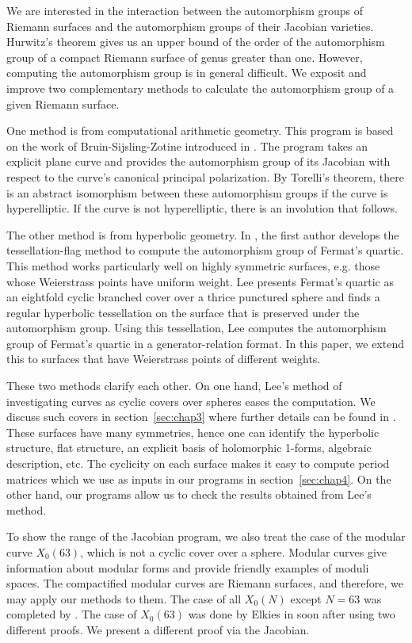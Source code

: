 \documentclass[12pt,reqno]{amsart}
\theoremstyle{definition}
\theoremstyle{remark}
\begin{document}
We are interested in the interaction between the automorphism groups of Riemann surfaces and the automorphism groups of their Jacobian varieties. Hurwitz's theorem gives us an upper bound of the order of the automorphism group of a compact Riemann surface of genus greater than one. However, computing the automorphism group is in general difficult. We exposit and improve two complementary methods to calculate the automorphism group of a given Riemann surface.

One method is from computational arithmetic geometry. This program is based on the work of Bruin-Sijsling-Zotine introduced in \cite{jeroen}. The program takes an explicit plane curve and provides the automorphism group of its Jacobian with respect to the curve's canonical principal polarization. By Torelli's theorem, there is an abstract isomorphism between these automorphism groups if the curve is hyperelliptic. If the curve is not hyperelliptic, there is an involution that follows.

The other method is from hyperbolic geometry. In \cite{dami}, the first author develops the tessellation-flag method to compute the automorphism group of Fermat's quartic. This method works particularly well on highly symmetric surfaces, e.g. those whose Weierstrass points have uniform weight. Lee presents Fermat's quartic as an eightfold cyclic branched cover over a thrice punctured sphere and finds a regular hyperbolic tessellation on the surface that is preserved under the automorphism group. Using this tessellation, Lee computes the automorphism group of Fermat's quartic in a generator-relation format. In this paper, we extend this to surfaces that have Weierstrass points of different weights.

These two methods clarify each other. On one hand, Lee's method of investigating curves as cyclic covers over spheres eases the computation. We discuss such covers in section~\ref{sec:chap3} where further details can be found in \cite{dthesis}. These surfaces have many symmetries, hence one can identify the hyperbolic structure, flat structure, an explicit basis of holomorphic 1-forms, algebraic description, etc. The cyclicity on each surface makes it easy to compute period matrices which we use as inputs in our programs in section~\ref{sec:chap4}. On the other hand, our programs allow us to check the results obtained from Lee's method. 

To show the range of the Jacobian program, we also treat the case of the modular curve $X_0(63)$, which is not a cyclic cover over a sphere. Modular curves give information about modular forms and provide friendly examples of moduli spaces. The compactified modular curves are Riemann surfaces, and therefore, we may apply our methods to them. The case of all $X_0(N)$ except $N = 63$ was completed by \cite{km}. The case of $X_0(63)$ was done by Elkies in \cite{elkies} soon after using two different proofs. We present a different proof via the Jacobian.
\end{document}
